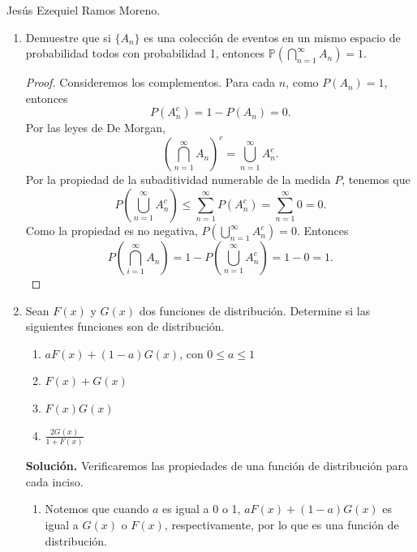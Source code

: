 \documentclass{article}
\newcommand{\ntarea}{1}
\begin{document}
\pagestyle{fancy}
\rhead{Tarea \ntarea}

\large{Jesús Ezequiel Ramos Moreno.}
\begin{enumerate}
    \item[2.] Demuestre que si \(\{A_n\}\) es una colección de eventos en un mismo espacio de probabilidad todos con probabilidad 1, entonces \(\mathbb{P}(\bigcap_{n=1}^{\infty} A_n) = 1\).
    \begin{proof}
        Consideremos los complementos. Para cada \(n\), como \(P(A_n) = 1\), entonces
        \[
        P(A_n^c) = 1 - P(A_n) = 0.
        \]
        Por las leyes de De Morgan,
        \[
        {\left(\bigcap_{n = 1}^\infty A_n\right)}^c = \bigcup_{n = 1}^\infty A_n ^c.
        \]
        Por la propiedad de la subaditividad numerable de la medida \(P\), tenemos que
        \[
        P\left(\bigcup_{n = 1} ^\infty A_n ^c\right) \leq \sum_{n = 1}^{\infty}P(A_n^c) = \sum_{n=1}^{\infty}0 = 0.
        \]
        Como la propiedad es no negativa, \(P\left(\bigcup_{n = 1} ^\infty A_n ^c\right) = 0\). Entonces 
        \[
        P\left(\bigcap_{i = 1}^\infty A_n\right) = 1 - P\left(\bigcup_{n = 1} ^\infty A_n ^c\right) = 1 - 0 = 1.
        \]
    \end{proof}
    \item[4.] Sean \(F(x)\) y \(G(x)\) dos funciones de distribución. Determine si las siguientes funciones son de distribución.
    \begin{enumerate}[label={(\roman*)}]
        \item \(aF(x) + (1 - a)G(x)\), con \(0 \leq a \leq 1\)
        \item \(F(x) + G(x)\)
        \item \(F(x)G(x)\)
        \item \(\frac{2G(x)}{1 + F(x)}\)
    \end{enumerate}
    \textbf{Solución.} Verificaremos las propiedades de una función de distribución para cada inciso.
    \begin{enumerate}[label={(\roman*)}]
        \item Notemos que cuando \(a\) es igual a 0 o 1, \(aF(x) + (1 - a)G(x)\) es igual a \(G(x)\) o \(F(x)\), respectivamente, por lo que es una función de distribución.
        

\end{enumerate}
\end{enumerate}
\end{document}
